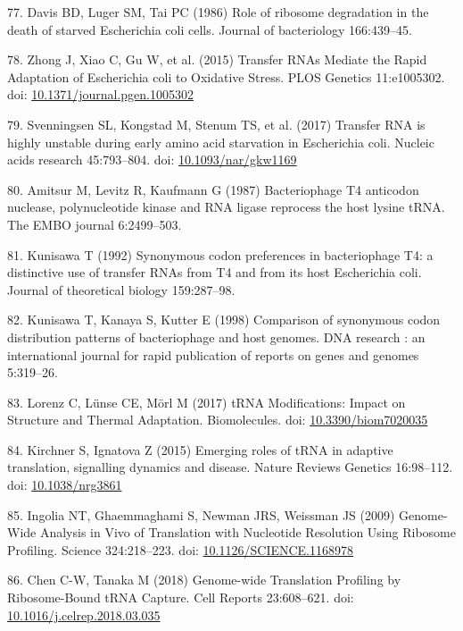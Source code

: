 \documentclass[12pt,twoside]{mitthesis-manusdown}
\begin{document}
\hypertarget{ref-Davis1986}{}
77. Davis BD, Luger SM, Tai PC (1986) Role of ribosome degradation in
the death of starved Escherichia coli cells. Journal of bacteriology
166:439--45.

\hypertarget{ref-Zhong2015}{}
78. Zhong J, Xiao C, Gu W, et al. (2015) Transfer RNAs Mediate the Rapid
Adaptation of Escherichia coli to Oxidative Stress. PLOS Genetics
11:e1005302. doi:
\href{https://doi.org/10.1371/journal.pgen.1005302}{10.1371/journal.pgen.1005302}

\hypertarget{ref-Svenningsen2017}{}
79. Svenningsen SL, Kongstad M, Stenum TS, et al. (2017) Transfer RNA is
highly unstable during early amino acid starvation in Escherichia coli.
Nucleic acids research 45:793--804. doi:
\href{https://doi.org/10.1093/nar/gkw1169}{10.1093/nar/gkw1169}

\hypertarget{ref-Amitsur1987}{}
80. Amitsur M, Levitz R, Kaufmann G (1987) Bacteriophage T4 anticodon
nuclease, polynucleotide kinase and RNA ligase reprocess the host lysine
tRNA. The EMBO journal 6:2499--503.

\hypertarget{ref-Kunisawa1992}{}
81. Kunisawa T (1992) Synonymous codon preferences in bacteriophage T4:
a distinctive use of transfer RNAs from T4 and from its host Escherichia
coli. Journal of theoretical biology 159:287--98.

\hypertarget{ref-Kunisawa1998}{}
82. Kunisawa T, Kanaya S, Kutter E (1998) Comparison of synonymous codon
distribution patterns of bacteriophage and host genomes. DNA research :
an international journal for rapid publication of reports on genes and
genomes 5:319--26.

\hypertarget{ref-Lorenz2017}{}
83. Lorenz C, Lünse CE, Mörl M (2017) tRNA Modifications: Impact on
Structure and Thermal Adaptation. Biomolecules. doi:
\href{https://doi.org/10.3390/biom7020035}{10.3390/biom7020035}

\hypertarget{ref-Kirchner2015}{}
84. Kirchner S, Ignatova Z (2015) Emerging roles of tRNA in adaptive
translation, signalling dynamics and disease. Nature Reviews Genetics
16:98--112. doi: \href{https://doi.org/10.1038/nrg3861}{10.1038/nrg3861}

\hypertarget{ref-Ingolia2009}{}
85. Ingolia NT, Ghaemmaghami S, Newman JRS, Weissman JS (2009)
Genome-Wide Analysis in Vivo of Translation with Nucleotide Resolution
Using Ribosome Profiling. Science 324:218--223. doi:
\href{https://doi.org/10.1126/SCIENCE.1168978}{10.1126/SCIENCE.1168978}

\hypertarget{ref-Chen2018}{}
86. Chen C-W, Tanaka M (2018) Genome-wide Translation Profiling by
Ribosome-Bound tRNA Capture. Cell Reports 23:608--621. doi:
\href{https://doi.org/10.1016/j.celrep.2018.03.035}{10.1016/j.celrep.2018.03.035}
\end{document}

